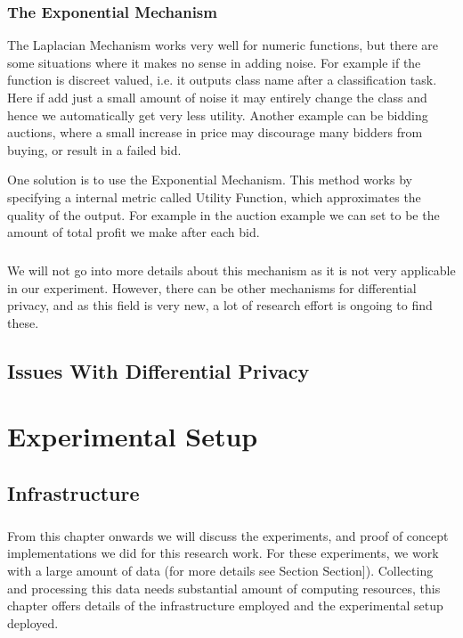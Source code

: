 \documentclass[12pt]{report}
\theoremstyle{named}
\begin{document}
\subsection{The Exponential Mechanism}
The Laplacian Mechanism works very well for numeric functions, but there are some situations where it makes no sense in adding noise. For example if the function is discreet valued, i.e. it outputs class name after a classification task. Here if add just a small amount of noise it may entirely change the class and hence we automatically get very less utility. Another example can be bidding auctions, where a small increase in price may discourage many bidders from buying, or result in a failed bid.

One solution is to use the Exponential Mechanism\cite{mcsherry2007mechanism}. This method works by specifying a internal metric called Utility Function, which approximates the quality of the output. For example in the auction example we can set to be the amount of total profit we make after each bid.


\paragraph{}
We will not go into more details about this mechanism as it is not very applicable in our experiment. However, there can be other mechanisms for differential privacy, and as this field is very new, a lot of research effort is ongoing to find these.

\section{Issues With Differential Privacy}



\chapter{Experimental Setup}
\section{Infrastructure}
\paragraph{}
From this chapter onwards we will discuss the experiments, and proof of concept implementations we did for this research work. For these experiments, we work with a large amount of data (for more details see Section 
Section]). Collecting and processing this data needs substantial amount of computing resources, this chapter offers details of the infrastructure employed and the experimental setup deployed.
\end{document}
